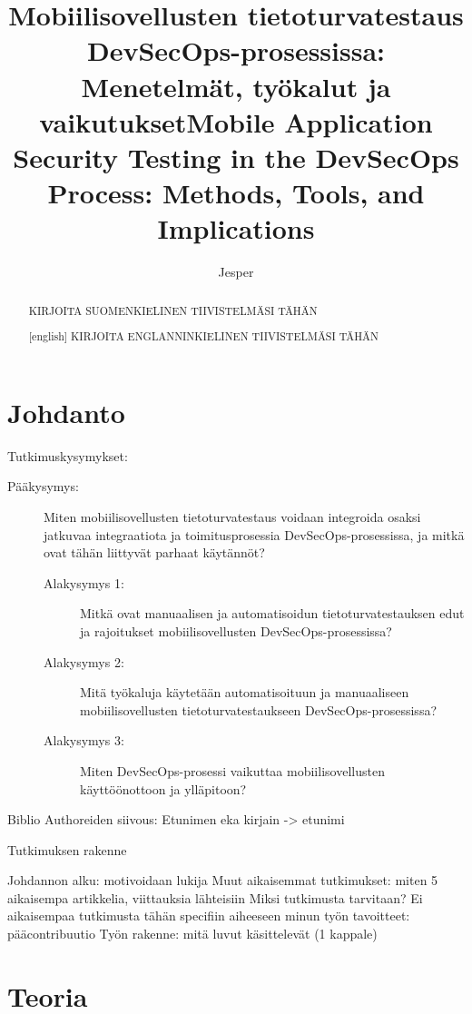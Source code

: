 \documentclass[bscthesis,finnish,oneside,biblatex]{uefcsthesis}
\title{Mobiilisovellusten tietoturvatestaus DevSecOps-prosessissa: Menetelmät, työkalut ja vaikutukset} %
\title[english]{Mobile Application Security Testing in the DevSecOps Process: Methods, Tools, and Implications} %
\author{Jesper}{Kauppinen} %
\date{\thismonth} %
\begin{document}
\maketitle
\begin{abstract}
KIRJOITA SUOMENKIELINEN TIIVISTELMÄSI TÄHÄN
\end{abstract}

\begin{abstract}[english]
KIRJOITA ENGLANNINKIELINEN TIIVISTELMÄSI TÄHÄN
\end{abstract}

\frontmatter
\tableofcontents
\mainmatter

\chapter{Johdanto}
\label{cha:johdanto}

Tutkimuskysymykset:

\begin{description}
    \item[Pääkysymys:] Miten mobiilisovellusten tietoturvatestaus voidaan integroida osaksi jatkuvaa integraatiota ja toimitusprosessia DevSecOps-prosessissa, ja mitkä ovat tähän liittyvät parhaat käytännöt?
    \begin{description}
        \item[Alakysymys 1:] Mitkä ovat manuaalisen ja automatisoidun tietoturvatestauksen edut ja rajoitukset mobiilisovellusten DevSecOps-prosessissa?
        \item[Alakysymys 2:] Mitä työkaluja käytetään automatisoituun ja manuaaliseen mobiilisovellusten tietoturvatestaukseen DevSecOps-prosessissa?
        \item[Alakysymys 3:] Miten DevSecOps-prosessi vaikuttaa mobiilisovellusten käyttöönottoon ja ylläpitoon?
    \end{description}
\end{description}

Biblio Authoreiden siivous:
Etunimen eka kirjain -> etunimi

Tutkimuksen rakenne

Johdannon alku:
motivoidaan lukija
Muut aikaisemmat tutkimukset: miten 5 aikaisempa artikkelia, viittauksia lähteisiin
Miksi tutkimusta tarvitaan? Ei aikaisempaa tutkimusta tähän specifiin aiheeseen
minun työn tavoitteet: pääcontribuutio
Työn rakenne: mitä luvut käsittelevät (1 kappale)

\chapter{Teoria}
\label{cha:teoria}
\end{document}
